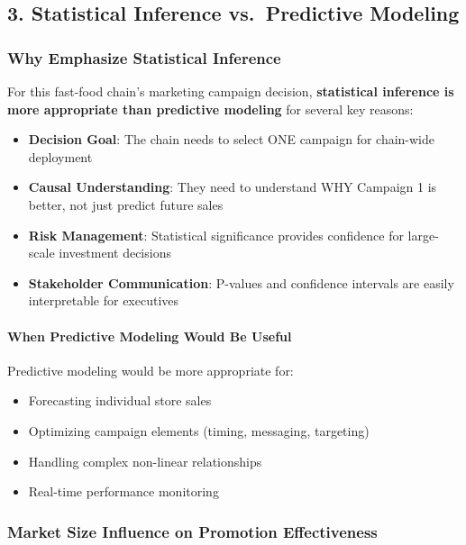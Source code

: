 \documentclass[
]{article}
\providecommand{\tightlist}{%
  \setlength{\itemsep}{0pt}\setlength{\parskip}{0pt}}
\begin{document}
\subsection{3. Statistical Inference vs.~Predictive
Modeling}\label{statistical-inference-vs.-predictive-modeling}

\subsubsection{Why Emphasize Statistical
Inference}\label{why-emphasize-statistical-inference}

For this fast-food chain's marketing campaign decision,
\textbf{statistical inference is more appropriate than predictive
modeling} for several key reasons:

\begin{itemize}
\tightlist
\item
  \textbf{Decision Goal}: The chain needs to select ONE campaign for
  chain-wide deployment
\item
  \textbf{Causal Understanding}: They need to understand WHY Campaign 1
  is better, not just predict future sales
\item
  \textbf{Risk Management}: Statistical significance provides confidence
  for large-scale investment decisions
\item
  \textbf{Stakeholder Communication}: P-values and confidence intervals
  are easily interpretable for executives
\end{itemize}

\paragraph{When Predictive Modeling Would Be
Useful}\label{when-predictive-modeling-would-be-useful}

Predictive modeling would be more appropriate for:

\begin{itemize}
\tightlist
\item
  Forecasting individual store sales
\item
  Optimizing campaign elements (timing, messaging, targeting)
\item
  Handling complex non-linear relationships
\item
  Real-time performance monitoring
\end{itemize}

\subsubsection{Market Size Influence on Promotion
Effectiveness}\label{market-size-influence-on-promotion-effectiveness}
\end{document}
